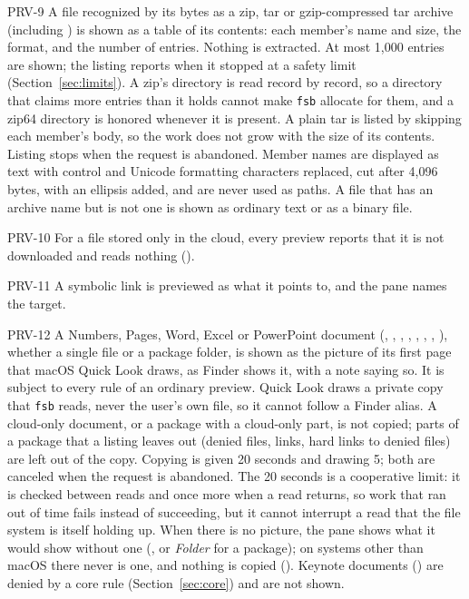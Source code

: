 \begin{req}{PRV-9}
A file recognized by its bytes as a zip, tar or gzip-compressed tar archive (including
) is shown as a table of its contents: each member's name and size, the
format, and the number of entries.  Nothing is extracted.  At most 1{,}000 entries are
shown; the listing reports when it stopped at a safety limit
(Section~\ref{sec:limits}).  A zip's directory is read record by record, so a
directory that claims more entries than it holds cannot make \texttt{fsb} allocate
for them, and a zip64 directory is honored whenever it is present.  A plain tar is
listed by skipping each member's body, so the work does not grow with the size of
its contents.  Listing stops when the request is abandoned.  Member names are
displayed as text with control and Unicode formatting characters replaced, cut
after 4{,}096 bytes, with an ellipsis added, and are never used as paths.  A file that has an archive name but
is not one is shown as ordinary text or as a binary file.
\end{req}

\begin{req}{PRV-10}
For a file stored only in the cloud, every preview reports that it is not downloaded
and reads nothing ().
\end{req}

\begin{req}{PRV-11}
A symbolic link is previewed as what it points to, and the pane names the target.
\end{req}

\begin{req}{PRV-12}
A Numbers, Pages, Word, Excel or PowerPoint document (,
, , , , ,
, ), whether a single file or a package folder, is shown as
the picture of its first page that macOS Quick Look draws, as Finder shows it, with
a note saying so.  It is subject to every rule of an ordinary preview.  Quick Look
draws a private copy that \texttt{fsb} reads, never the user's own file, so it
cannot follow a Finder alias.  A cloud-only document, or a package with a cloud-only
part, is not copied; parts of a package that a listing leaves out (denied files,
links, hard links to denied files) are left out of the copy.  Copying is given 20 seconds and drawing 5; both are canceled when the request is
abandoned.  The 20 seconds is a cooperative limit: it is checked between reads and
once more when a read returns, so work that ran out of time fails instead of
succeeding, but it cannot interrupt a read that the file system is itself holding up.  When there is no picture, the pane shows what it would
show without one (, or \emph{Folder} for a package); on systems other than
macOS there never is one, and nothing is copied ().  Keynote documents
() are denied by a core rule (Section~\ref{sec:core}) and are not shown.
\end{req}

